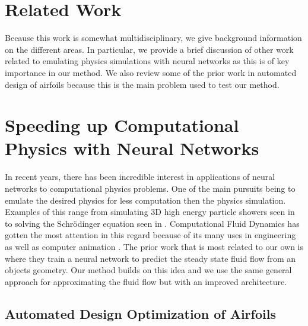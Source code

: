 \documentclass{article} %
\begin{document}
\section{Related Work}

Because this work is somewhat multidisciplinary, we give background information on the different areas. In particular, we provide a brief discussion of other work related to emulating physics simulations with neural networks as this is of key importance in our method. We also review some of the prior work in automated design of airfoils because this is the main problem used to test our method.

\section{Speeding up Computational Physics with Neural Networks}

In recent years, there has been incredible interest in applications of neural networks to computational physics problems. One of the main pursuits being to emulate the desired physics for less computation then the physics simulation. Examples of this range from simulating 3D high energy particle showers seen in \citep{2017arXiv170502355P} to solving the Schrödinger equation seen in \citep{mills2017deep}. Computational Fluid Dynamics has gotten the most attention in this regard because of its many uses in engineering as well as computer animation \cite{tompson2016accelerating} \cite{2017arXiv170509036H}. The prior work that is most related to our own is \citep{guo2016convolutional} where they train a neural network to predict the steady state fluid flow from an objects geometry. Our method builds on this idea and we use the same general approach for approximating the fluid flow but with an improved architecture.

\subsection{Automated Design Optimization of Airfoils}
\end{document}
